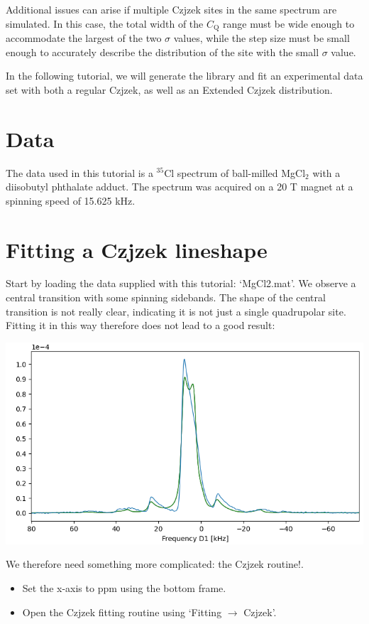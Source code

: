 \documentclass[11pt,a4paper]{article}
\begin{document}
Additional issues can arise if multiple Czjzek sites in the same spectrum are simulated. In this case, the total width of the $C_\text{Q}$ range must be wide enough to accommodate the largest of the two $\sigma$ values, while the step size must be small enough to accurately describe the distribution of the site with the small $\sigma$ value.

In the following tutorial, we will generate the library and fit an experimental data set with both a regular Czjzek, as well as an Extended Czjzek distribution.


\section{Data}
The data used in this tutorial is a $^{35}$Cl spectrum of ball-milled MgCl$_2$ with a diisobutyl phthalate adduct. The spectrum was acquired on a 20 T magnet at a spinning speed of 15.625 kHz.


\section{Fitting a Czjzek lineshape}
Start by loading the data supplied with this tutorial: `MgCl2.mat'. We observe a central transition with some spinning sidebands. The shape of the central transition is not really clear, indicating it is not just a single quadrupolar site. Fitting it in this way therefore does not lead to a good result:

\begin{center}
\includegraphics[width=0.8\linewidth]{Figs/fig1.PNG}
\end{center}

We therefore need something more complicated: the Czjzek routine!.
\begin{itemize}
  \item Set the x-axis to ppm using the bottom frame. 
  \item Open the Czjzek fitting routine using `Fitting $\longrightarrow$ Czjzek'.
\end{itemize}
\end{document}
